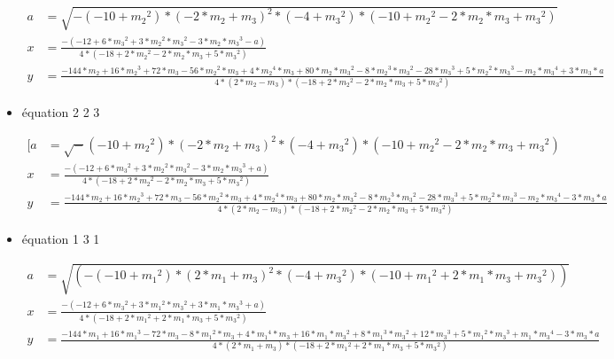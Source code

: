 \documentclass[a4paper, 8pt]{article}
\begin{document}
\begin{itemize}[label=$\bullet$]
 \begin{equation} \label{5}
   	\begin{split}
   a & = \sqrt{-(-10+{{m}_{2}}^{2})*{(-2*{m}_{2}+{m}_{3})}^{2}*(-4+{{m}_{3}}^{2})*(-10+{{m}_{2}}^{2}-2*{m}_{2}*{m}_{3}+{{m}_{3}}^{2})}\\
   x  & =  \frac{-(-12+6*{{m}_{3}}^{2}+3*{{m}_{2}}^{2}*{{m}_{3}}^{2}-3*{m}_{2}*{{m}_{3}}^{3}-a)}{4*(-18+2*{{m}_{2}}^{2}-2*{m}_{2}*{m}_{3}+5*{{m}_{3}}^{2})} \\
   	y &  = \frac{-144*{m}_{2}+16*{{m}_{2}}^{3}+72*{m}_{3}-56*{{m}_{2}}^{2}*{m}_{3}+4*{{m}_{2}}^{4}*{m}_{3}+80*{m}_{2}*{{m}_{3}}^{2}-8*{{m}_{2}}^{3}*{{m}_{3}}^{2}-28*{{m}_{3}}^{3}+5*{{m}_{2}}^{2}*{{m}_{3}}^{3}-{m}_{2}*{{m}_{3}}^{4}+3*{m}_{3}*a}{4*(2*{m}_{2}-{m}_{3})*(-18+2*{{m}_{2}}^{2}-2*{m}_{2}*{m}_{3}+5*{{m}_{3}}^{2})}
   	\end{split}
 \end{equation}
\item équation 2 2 3

\begin{equation} \label{6}
   	\begin{split}
   [a & = \sqrt-(-10+{{m}_{2}}^{2})*{(-2*{m}_{2}+{m}_{3})}^{2}*(-4+{{m}_{3}}^{2})*(-10+{{m}_{2}}^{2}-2*{m}_{2}*{m}_{3}+{{m}_{3}}^{2})\\
  x & = \frac{-(-12+6*{{m}_{3}}^{2}+3*{{m}_{2}}^{2}*{{m}_{3}}^{2}-3*{m}_{2}*{{m}_{3}}^{3}+a)}{4*(-18+2*{{m}_{2}}^{2} -2*{m}_{2}*{m}_{3}+5*{{m}_{3}}^{2})} \\
   	y & = \frac{-144*{m}_{2}+16*{{m}_{2}}^{3}+72*{m}_{3}-56*{{m}_{2}}^{2}*{m}_{3}+4*{{m}_{2}}^{4}*{m}_{3}+80*{m}_{2}*{{m}_{3}}^{2}-8*{{m}_{2}}^{3}*{{m}_{3}}^{2}-28*{{m}_{3}}^{3}+5*{{m}_{2}}^{2}*{{m}_{3}}^{3}-{m}_{2}*{{m}_{3}}^{4}-3*{m}_{3}*a}{4*(2*{m}_{2}-{m}_{3})*(-18+2*{{m}_{2}}^{2}-2*{m}_{2}*{m}_{3}+5*{{m}_{3}}^{2})}
   	\end{split}
\end{equation}


\item équation 1 3 1

\begin{equation} \label{3}
   	\begin{split}
  a & = \sqrt{(-(-10+{{m}_{1}}^{2})*{(2*{m}_{1}+{m}_{3})}^{2}*(-4+{{m}_{3}}^{2})*(-10+{{m}_{1}}^{2}+2*{m}_{1}*{m}_{3}+{{m}_{3}}^{2}))}\\
  x & = \frac{-(-12+6*{{m}_{3}}^{2}+3*{{m}_{1}}^{2}*{{m}_{3}}^{2}+3*{m}_{1}*{{m}_{3}}^{3}+a)}{4*(-18+2* {{m}_{1}}^{2}+2*{m}_{1}*{m}_{3}+5*{{m}_{3}}^{2})} \\
   	y & = \frac{-144*{m}_{1}+16*{{m}_{1}}^{3}-72*{m}_{3}-8*{{m}_{1}}^{2}*{m}_{3}+4*{{m}_{1}}^{4}*{m}_{3}+16*{m}_{1}*{{m}_{3}}^{2}+8*{{m}_{1}}^{3}*{{m}_{3}}^{2}+12*{{m}_{3}}^{3}+5*{{m}_{1}}^{2}*{{m}_{3}}^{3}+{m}_{1}*{{m}_{3}}^{4}-3*{m}_{3}*a}{4*(2*{m}_{1}+{m}_{3})*(-18+2*{{m}_{1}}^{2}+2*{m}_{1}*{m}_{3}+5*{{m}_{3}}^{2})}
   	\end{split}
\end{equation}


\end{itemize}
\end{document}
